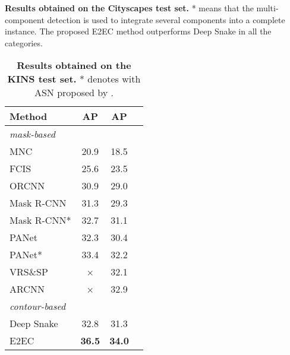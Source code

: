 \documentclass[10pt,twocolumn,letterpaper]{article}
\begin{document}
\begin{table*}[t]
\begin{minipage}[c]{0.75\linewidth}
\begin{footnotesize}
  \end{footnotesize}
  \caption{\textbf{Results obtained on the Cityscapes test set.} * means that the multi-component detection is used to integrate several components into a complete instance. The proposed E2EC method outperforms Deep Snake \cite{deepsnake} in all the categories.}
  \label{tab:city}
\end{minipage}\hfill
\begin{minipage}[c]{0.03\linewidth}
\end{minipage}\hfill
\begin{minipage}[c]{0.22\linewidth}\vspace{-2mm}
  \centering
  \setlength{\tabcolsep}{0.2mm}
  \begin{footnotesize}
  \begin{tabular}{l|c|cc}
    Method & AP & AP\\
    \hline
    \emph{mask-based} & & &\\
    MNC \cite{mnc} & 20.9 & 18.5\\
    FCIS \cite{fcis} & 25.6 & 23.5\\
    ORCNN \cite{orcnn} & 30.9 & 29.0\\
    Mask R-CNN \cite{maskrcnn} & 31.3 & 29.3\\
    Mask R-CNN* \cite{kins} & 32.7 & 31.1\\
    PANet \cite{panet} & 32.3 & 30.4\\
    PANet* \cite{kins} & 33.4 & 32.2\\
    VRS\&SP \cite{vrssp} & × & 32.1\\
    ARCNN \cite{arcnn} & × & 32.9\\
    \hline
    \emph{contour-based}& & &\\
    Deep Snake \cite{deepsnake} & 32.8 & 31.3\\
    E2EC & \textbf{36.5} & \textbf{34.0}\\
  \end{tabular}\vspace{-4mm}
  \end{footnotesize}
  \caption{\textbf{Results obtained on the KINS test set.} * denotes with ASN proposed by \cite{kins}.}
  \label{tab:kins}
\end{minipage}\hfill\vspace{-3mm}
\end{table*}
\end{document}
